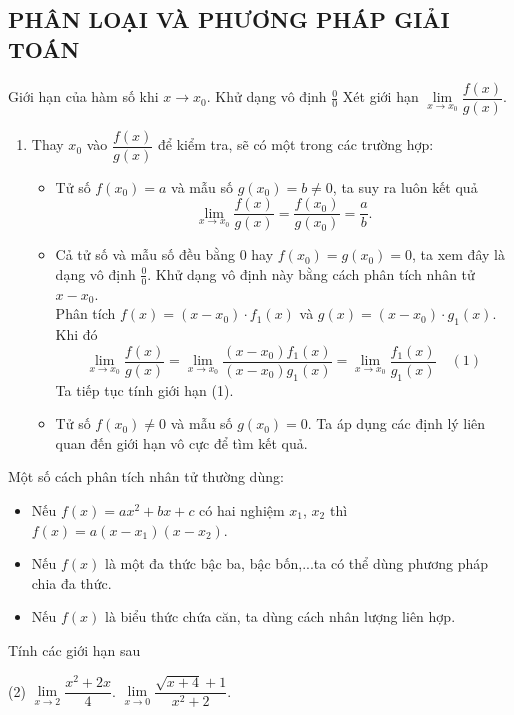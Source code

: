 \subsection{PHÂN LOẠI VÀ PHƯƠNG PHÁP GIẢI TOÁN}
\setcounter{dang}{0}
\begin{dang}{Giới hạn của hàm số khi $x \to x_0$. Khử dạng vô định $\displaystyle\frac{0}{0}$ }
	Xét giới hạn $\lim\limits_{x\to x_0}\dfrac{f(x)}{g(x)}$.
	\begin{enumerate}[\iconCV]
		\item {} Thay $x_0$ vào $\dfrac{f(x)}{g(x)}$ để kiểm tra, sẽ có một trong các trường hợp:
		\begin{itemize}
			\item [\ding{172}] Tử số $f(x_0)=a$ và mẫu số $g(x_0)=b \ne 0$,  ta suy ra luôn kết quả $$\lim\limits_{x\to x_0}\dfrac{f(x)}{g(x)}=\dfrac{f(x_0)}{g(x_0)}=\dfrac{a}{b}.$$
			\item [\ding{173}]  Cả tử số và mẫu số đều bằng 0 hay $f(x_0)=g(x_0)=0$, ta xem đây là dạng vô định $\displaystyle\frac{0}{0}$. Khử dạng vô định này bằng cách phân tích nhân tử $x-x_0$.\\
			Phân tích $f(x)=(x-x_0) \cdot f_1(x)$ và $g(x)=(x-x_0) \cdot g_1(x)$. Khi đó
			$$\lim\limits_{x\to x_0}\frac{f(x)}{g(x)}=\lim\limits_{x\to x_0}\frac{(x-x_0)f_1(x)}{(x-x_0)g_1(x)}=\lim\limits_{x\to x_0}\frac{f_1(x)}{g_1(x)} \quad (1)$$
			Ta tiếp tục tính giới hạn (1).
			\item [\ding{174}] Tử số $f(x_0) \ne 0$ và mẫu số $g(x_0)=0$. Ta áp dụng các định lý liên quan đến giới hạn vô cực để tìm kết quả.
		\end{itemize}
		\end{enumerate}
	\begin{note}
		Một số cách phân tích nhân tử thường dùng:
		\begin{itemize}
			\item [$\bullet$] Nếu $f(x)=ax^2+bx+c$ có hai nghiệm $x_1$, $x_2$ thì $f(x)=a(x-x_1)(x-x_2)$.
			\item [$\bullet$] Nếu $f(x)$ là một đa thức bậc ba, bậc bốn,...ta có thể dùng phương pháp chia đa thức.
			\item [$\bullet$] Nếu $f(x)$ là biểu thức chứa căn, ta dùng cách nhân lượng liên hợp.	
		\end{itemize}
	\end{note}
\end{dang}

\begin{vd}
	Tính các giới hạn sau
	\begin{tasks}(2)
		\task $\lim\limits_{x\to 2}\dfrac{x^2+2x}{4}$.
		\task $\lim\limits_{x\to 0}\dfrac{\sqrt{x+4}+1}{x^2+2}$.
	\end{tasks}
	
\end{vd}

